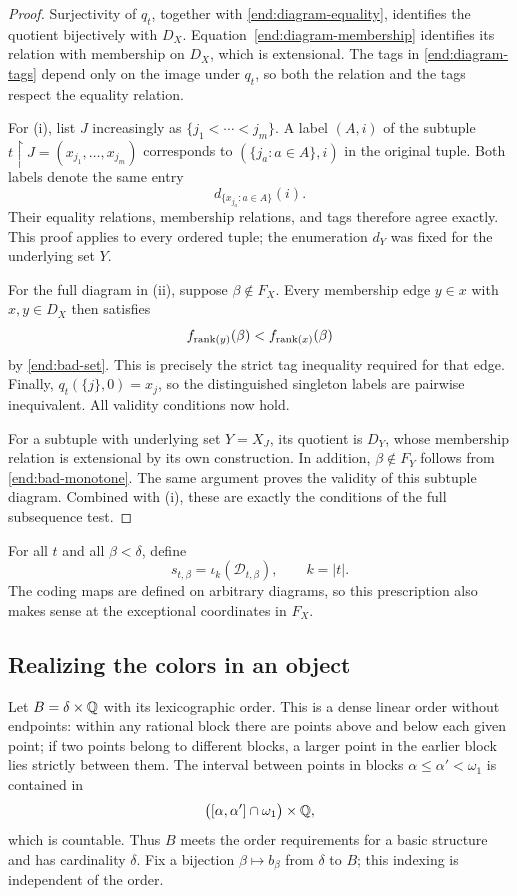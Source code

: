 \begin{proof}
Surjectivity of \(q_t\), together with
\eqref{end:diagram-equality}, identifies the quotient
bijectively with \(D_X\).
Equation~\eqref{end:diagram-membership} identifies its
relation with membership on \(D_X\), which is
extensional.  The tags in \eqref{end:diagram-tags}
depend only on the image under \(q_t\), so both the
relation and the tags respect the equality relation.

For \textup{(i)}, list \(J\) increasingly as
\(\{j_1<\cdots<j_m\}\).  A label \((A,i)\) of the
subtuple \(t\restriction J=(x_{j_1},\ldots,x_{j_m})\) corresponds
to \((\{j_a:a\in A\},i)\) in the original tuple.
Both labels denote the same entry
\[
  d_{\{x_{j_a}:a\in A\}}(i).
\]
Their equality relations, membership relations, and
tags therefore agree exactly.  This proof applies to
every ordered tuple; the enumeration \(d_Y\) was fixed
for the underlying set \(Y\).

For the full diagram in \textup{(ii)}, suppose
\(\beta\notin F_X\).  Every membership edge \(y\in x\)
with \(x,y\in D_X\) then satisfies
\[
  f_{\operatorname{rank}(y)}(\beta)<f_{\operatorname{rank}(x)}(\beta)
\]
by \eqref{end:bad-set}.  This is precisely the strict
tag inequality required for that edge.  Finally,
\(q_t(\{j\},0)=x_j\), so the distinguished singleton
labels are pairwise inequivalent.  All validity
conditions now hold.

For a subtuple with underlying set \(Y=X_J\), its
quotient is \(D_Y\), whose membership relation is
extensional by its own construction.  In addition,
\(\beta\notin F_Y\) follows from
\eqref{end:bad-monotone}.  The same argument proves
the validity of this subtuple diagram.  Combined
with \textup{(i)}, these are exactly the conditions
of the full subsequence test.
\end{proof}

For all \(t\) and all \(\beta<\delta\), define
\begin{equation}\label{end:prescribed-colors}
  s_{t,\beta}=\iota_k(\mathcal D_{t,\beta}),
  \qquad k=|t|.
\end{equation}
The coding maps are defined on arbitrary diagrams, so
this prescription also makes sense at the exceptional
coordinates in \(F_X\).

\subsection{Realizing the colors in an object}

Let \(B=\delta\times\mathbb Q\) with its lexicographic order.
This is a dense linear order without endpoints:
within any rational block there are points above and
below each given point; if two points belong to
different blocks, a larger point in the earlier block
lies strictly between them.  The interval between
points in blocks \(\alpha\leq\alpha'<\omega_1\) is
contained in
\[
  \bigl([\alpha,\alpha']\cap\omega_1\bigr)\times\mathbb Q,
\]
which is countable.  Thus \(B\) meets the order
requirements for a basic structure and has
cardinality \(\delta\).  Fix a bijection
\(\beta\mapsto b_\beta\) from \(\delta\) to \(B\);
this indexing is independent of the order.


